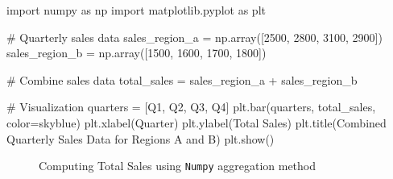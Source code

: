 \documentclass[
  letterpaper,
  DIV=11,
  numbers=noendperiod]{scrreprt}
\newenvironment{Shaded}{\begin{snugshade}}{\end{snugshade}}
\newcommand{\CommentTok}[1]{\textcolor[rgb]{0.37,0.37,0.37}{#1}}
\newcommand{\DecValTok}[1]{\textcolor[rgb]{0.68,0.00,0.00}{#1}}
\newcommand{\ImportTok}[1]{\textcolor[rgb]{0.00,0.46,0.62}{#1}}
\newcommand{\NormalTok}[1]{\textcolor[rgb]{0.00,0.23,0.31}{#1}}
\newcommand{\OperatorTok}[1]{\textcolor[rgb]{0.37,0.37,0.37}{#1}}
\newcommand{\StringTok}[1]{\textcolor[rgb]{0.13,0.47,0.30}{#1}}
\theoremstyle{plain}
\theoremstyle{definition}
\theoremstyle{remark}
\begin{document}
\begin{Shaded}
\begin{Highlighting}[]
\ImportTok{import}\NormalTok{ numpy }\ImportTok{as}\NormalTok{ np}
\ImportTok{import}\NormalTok{ matplotlib.pyplot }\ImportTok{as}\NormalTok{ plt}

\CommentTok{\# Quarterly sales data}
\NormalTok{sales\_region\_a }\OperatorTok{=}\NormalTok{ np.array([}\DecValTok{2500}\NormalTok{, }\DecValTok{2800}\NormalTok{, }\DecValTok{3100}\NormalTok{, }\DecValTok{2900}\NormalTok{])}
\NormalTok{sales\_region\_b }\OperatorTok{=}\NormalTok{ np.array([}\DecValTok{1500}\NormalTok{, }\DecValTok{1600}\NormalTok{, }\DecValTok{1700}\NormalTok{, }\DecValTok{1800}\NormalTok{])}

\CommentTok{\# Combine sales data}
\NormalTok{total\_sales }\OperatorTok{=}\NormalTok{ sales\_region\_a }\OperatorTok{+}\NormalTok{ sales\_region\_b}

\CommentTok{\# Visualization}
\NormalTok{quarters }\OperatorTok{=}\NormalTok{ [}\StringTok{\textquotesingle{}Q1\textquotesingle{}}\NormalTok{, }\StringTok{\textquotesingle{}Q2\textquotesingle{}}\NormalTok{, }\StringTok{\textquotesingle{}Q3\textquotesingle{}}\NormalTok{, }\StringTok{\textquotesingle{}Q4\textquotesingle{}}\NormalTok{]}
\NormalTok{plt.bar(quarters, total\_sales, color}\OperatorTok{=}\StringTok{\textquotesingle{}skyblue\textquotesingle{}}\NormalTok{)}
\NormalTok{plt.xlabel(}\StringTok{\textquotesingle{}Quarter\textquotesingle{}}\NormalTok{)}
\NormalTok{plt.ylabel(}\StringTok{\textquotesingle{}Total Sales\textquotesingle{}}\NormalTok{)}
\NormalTok{plt.title(}\StringTok{\textquotesingle{}Combined Quarterly Sales Data for Regions A and B\textquotesingle{}}\NormalTok{)}
\NormalTok{plt.show()}
\end{Highlighting}
\end{Shaded}

\begin{figure}[H]


\caption{\label{fig-total1}Computing Total Sales using \texttt{Numpy}
aggregation method}

\end{figure}%
\end{document}
